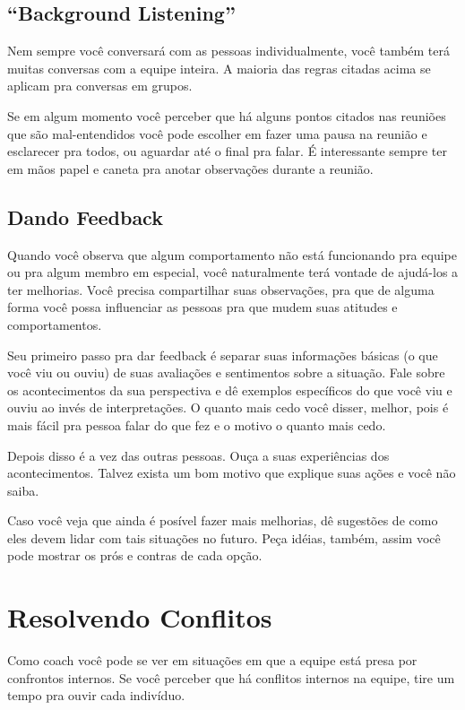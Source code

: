 \documentclass[a4paper, 10pt, font=plain]{abnt}
\begin{document}
\subsection{``Background Listening''}
Nem sempre você conversará com as pessoas individualmente, você também terá muitas conversas com a equipe inteira. A maioria das regras citadas acima se aplicam pra conversas em grupos.

Se em algum momento você perceber que há alguns pontos citados nas reuniões que são mal-entendidos você pode escolher em fazer uma pausa na reunião e esclarecer pra todos, ou aguardar até o final pra falar. É interessante sempre ter em mãos papel e caneta pra anotar observações durante a reunião.

\subsection{Dando Feedback}
Quando você observa que algum comportamento não está funcionando pra equipe ou pra algum membro em especial, você naturalmente terá vontade de ajudá-los a ter melhorias. Você precisa compartilhar suas observações, pra que de alguma forma você possa influenciar as pessoas pra que mudem suas atitudes e comportamentos.

Seu primeiro passo pra dar feedback é separar suas informações básicas (o que você viu ou ouviu) de suas avaliações e sentimentos sobre a situação. Fale sobre os acontecimentos da sua perspectiva e dê exemplos específicos do que você viu e ouviu ao invés de interpretações. O quanto mais cedo você disser, melhor, pois é mais fácil pra pessoa falar do que fez e o motivo o quanto mais cedo.

Depois disso é a vez das outras pessoas. Ouça a suas experiências dos acontecimentos. Talvez exista um bom motivo que explique suas ações e você não saiba.

Caso você veja que ainda é posível fazer mais melhorias, dê sugestões de como eles devem lidar com tais situações no futuro. Peça idéias, também, assim você pode mostrar os prós e contras de cada opção.


\section{Resolvendo Conflitos}
Como coach você pode se ver em situações em que a equipe está presa por confrontos internos. Se você perceber que há conflitos internos na equipe, tire um tempo pra ouvir cada indivíduo.
\end{document}

